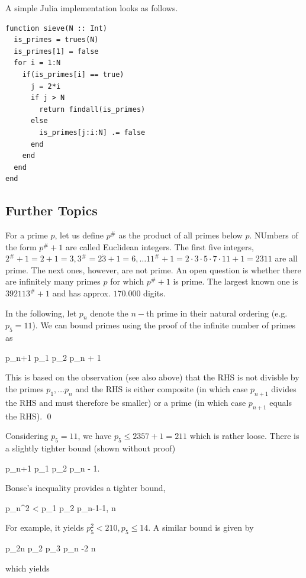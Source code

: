 A simple Julia implementation looks as follows.

\begin{verbatim}
function sieve(N :: Int)
  is_primes = trues(N)
  is_primes[1] = false
  for i = 1:N
    if(is_primes[i] == true)
      j = 2*i
      if j > N
        return findall(is_primes)
      else
        is_primes[j:i:N] .= false
      end
    end
  end
end
\end{verbatim}


\subsection{Further Topics}

For a prime $p$, let us define $p^\#$ as the product of all primes below $p$. NUmbers of the form $p^\# + 1$ are called Euclidean integers. The first five integers, $2^\# + 1= 2 + 1 = 3, 3^\# = 2 \dot 3 + 1 = 6, \ldots 11^\# +1 = 2 \cdot 3 \cdot 5 \cdot 7 \cdot 11 +1 = 2311$ are all prime. The next ones, however, are not prime. An open question is whether there are infinitely many primes $p$ for which $p^\# + 1$ is prime. The largest known one is $392113^\# + 1$ and has approx. $170.000$ digits.

In the following, let $p_n$ denote the $n-$th prime in their natural ordering (e.g. $p_5 = 11$). We can bound primes using the proof of the infinite number of primes as

\bee
p_{n+1} \leq p_1 p_2 \cdots p_n + 1
\eee

This is based on the observation (see also above) that the RHS is not divisble by the primes $p_1, \ldots p_n$ and the RHS is either composite (in which case $p_{n+1}$ divides the RHS and must therefore be smaller) or a prime (in which case $p_{n+1}$ equals the RHS). \qed

Considering $p_5 = 11$, we have $p_5 \leq 2 3 5 7 + 1 = 211$ which is rather loose. There is a slightly tighter bound (shown without proof)

\bee
p_{n+1} \leq p_1 p_2 \cdots p_n - 1. 
\eee

Bonse's inequality provides a tighter bound, 

\bee
p_n^2  < p_1 p_2 \cdots p_{n-1}-1, \quad n 
\eee

For example, it yields $p_5^2 < 210, p_5 \leq 14$. A similar bound is given by

\bee
p_{2n} \leq p_2 p_3 \cdots p_n -2 \quad n 
\eee

which yields


